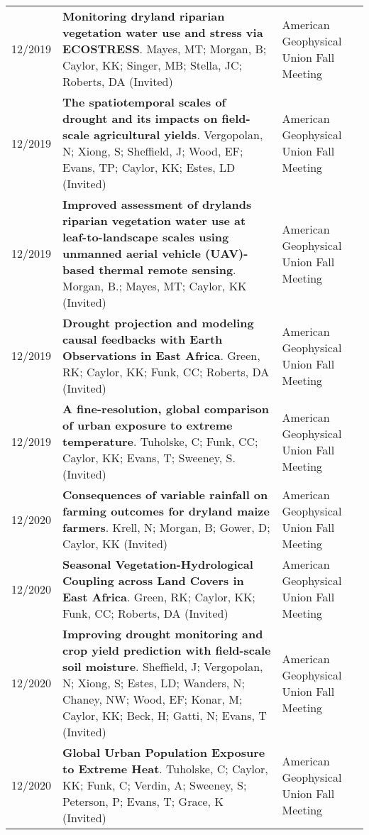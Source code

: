 \begin{longtable}{lp{10.0cm}p{4.5cm}}
12/2019 & {\bf Monitoring dryland riparian vegetation water use and stress via ECOSTRESS}. Mayes, MT; Morgan, B; Caylor, KK; Singer, MB; Stella, JC; Roberts, DA  (Invited)  & American Geophysical Union Fall Meeting \\
  
12/2019 & {\bf The spatiotemporal scales of drought and its impacts on field-scale agricultural yields}. Vergopolan, N; Xiong, S; Sheffield, J; Wood, EF; Evans, TP; Caylor, KK; Estes, LD  (Invited)  & American Geophysical Union Fall Meeting \\
  
12/2019 & {\bf Improved assessment of drylands riparian vegetation water use at leaf-to-landscape scales using unmanned aerial vehicle (UAV)-based thermal remote sensing}. Morgan, B.; Mayes, MT; Caylor, KK  (Invited)  & American Geophysical Union Fall Meeting \\
  
12/2019 & {\bf Drought projection and modeling causal feedbacks with Earth Observations in East Africa}. Green, RK; Caylor, KK; Funk, CC; Roberts, DA  (Invited)  & American Geophysical Union Fall Meeting \\
  
12/2019 & {\bf A fine-resolution, global comparison of urban exposure to extreme temperature}. Tuholske, C; Funk, CC; Caylor, KK; Evans, T; Sweeney, S.  (Invited)  & American Geophysical Union Fall Meeting \\
  
12/2020 & {\bf Consequences of variable rainfall on farming outcomes for dryland maize farmers}. Krell, N; Morgan, B; Gower, D; Caylor, KK  (Invited)  & American Geophysical Union Fall Meeting \\
  
12/2020 & {\bf Seasonal Vegetation-Hydrological Coupling across Land Covers in East Africa}. Green, RK; Caylor, KK; Funk, CC; Roberts, DA  (Invited)  & American Geophysical Union Fall Meeting \\
  
12/2020 & {\bf Improving drought monitoring and crop yield prediction with field-scale soil moisture}. Sheffield, J; Vergopolan, N; Xiong, S; Estes, LD; Wanders, N; Chaney, NW; Wood, EF; Konar, M; Caylor, KK; Beck, H; Gatti, N; Evans, T  (Invited)  & American Geophysical Union Fall Meeting \\
  
12/2020 & {\bf Global Urban Population Exposure to Extreme Heat}. Tuholske, C; Caylor, KK; Funk, C; Verdin, A; Sweeney, S; Peterson, P; Evans, T; Grace, K  (Invited)  & American Geophysical Union Fall Meeting \\
  

\end{longtable}
